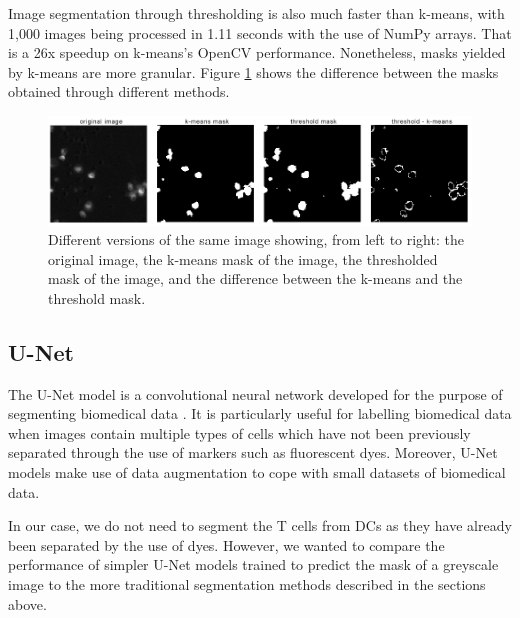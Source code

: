 Image segmentation through thresholding is also much faster than k-means, with 1,000 images being processed in 1.11 seconds with the use of NumPy arrays. That is a 26x speedup on k-means's OpenCV performance. Nonetheless, masks yielded by k-means are more granular. Figure \ref{fig:maskdiff} shows the difference between the masks obtained through different methods. 

\begin{figure}[h]
    \centering
    \includegraphics[width=\textwidth]{dissertation/figures/mask_difference.png}
    \caption{Different versions of the same image showing, from left to right: the original image, the k-means mask of the image, the thresholded mask of the image, and the difference between the k-means and the threshold mask.}
    \label{fig:maskdiff}
\end{figure}

\subsection{U-Net}

The U-Net model is a convolutional neural network developed for the purpose of segmenting biomedical data \citep{ronneberger_unet_2015}. It is particularly useful for labelling biomedical data when images contain multiple types of cells which have not been previously separated through the use of markers such as fluorescent dyes. Moreover, U-Net models make use of data augmentation to cope with small datasets of biomedical data. 

In our case, we do not need to segment the T cells from DCs as they have already been separated by the use of dyes. However, we wanted to compare the performance of simpler U-Net models trained to predict the mask of a greyscale image to the more traditional segmentation methods described in the sections above.


